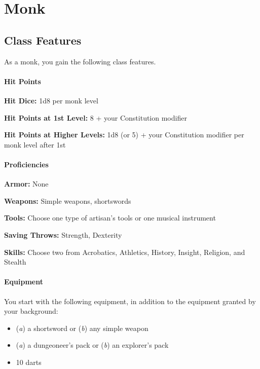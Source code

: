 \documentclass[
]{article}
\date{}
\providecommand{\tightlist}{%
  \setlength{\itemsep}{0pt}\setlength{\parskip}{0pt}}
\begin{document}
\hypertarget{monk}{%
\section{Monk}\label{monk}}

\hypertarget{class-features}{%
\subsection{Class Features}\label{class-features}}

As a monk, you gain the following class features.

\hypertarget{hit-points}{%
\paragraph{Hit Points}\label{hit-points}}

\textbf{Hit Dice:} 1d8 per monk level

\textbf{Hit Points at 1st Level:} 8 + your Constitution modifier

\textbf{Hit Points at Higher Levels:} 1d8 (or 5) + your Constitution
modifier per monk level after 1st

\hypertarget{proficiencies}{%
\paragraph{Proficiencies}\label{proficiencies}}

\textbf{Armor:} None

\textbf{Weapons:} Simple weapons, shortswords

\textbf{Tools:} Choose one type of artisan's tools or one musical
instrument

\textbf{Saving Throws:} Strength, Dexterity

\textbf{Skills:} Choose two from Acrobatics, Athletics, History,
Insight, Religion, and Stealth

\hypertarget{equipment}{%
\paragraph{Equipment}\label{equipment}}

You start with the following equipment, in addition to the equipment
granted by your background:

\begin{itemize}
\tightlist
\item
  (\emph{a}) a shortsword or (\emph{b}) any simple weapon
\item
  (\emph{a}) a dungeoneer's pack or (\emph{b}) an explorer's pack
\item
  10 darts
\end{itemize}
\end{document}
